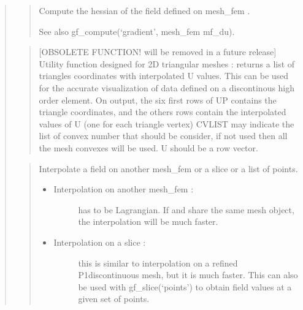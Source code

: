 \documentclass[a4paper,11pt,english]{sphinxmanual}
\begin{document}
\begin{quote}
\begin{quote}

Compute the hessian of the field  defined on mesh\_fem .

See also gf\_compute(‘gradient’, mesh\_fem mf\_du).
\end{quote}

\begin{quote}

{[}OBSOLETE FUNCTION! will be removed in a future release{]}
Utility function designed for 2D triangular meshes : returns a list
of triangles coordinates with interpolated U values. This can be
used for the accurate visualization of data defined on a
discontinous high order element. On output, the six first rows of UP
contains the triangle coordinates, and the others rows contain the
interpolated values of U (one for each triangle vertex) CVLIST may
indicate the list of convex number that should be consider, if not
used then all the mesh convexes will be used. U should be a row
vector.
\end{quote}

\begin{quote}

Interpolate a field on another mesh\_fem or a slice or a list of points.
\begin{itemize}
\item {} \begin{description}
\item[{Interpolation on another mesh\_fem :}] \leavevmode
{} has to be Lagrangian. If  and  share the same
mesh object, the interpolation will be much faster.

\end{description}

\item {} \begin{description}
\item[{Interpolation on a slice :}] \leavevmode
this is similar to interpolation on a refined P1\sphinxhyphen{}discontinuous
mesh, but it is much faster. This can also be used with
gf\_slice(‘points’) to obtain field values at a given set of
points.


\end{description}
\end{itemize}
\end{quote}
\end{quote}
\end{document}
